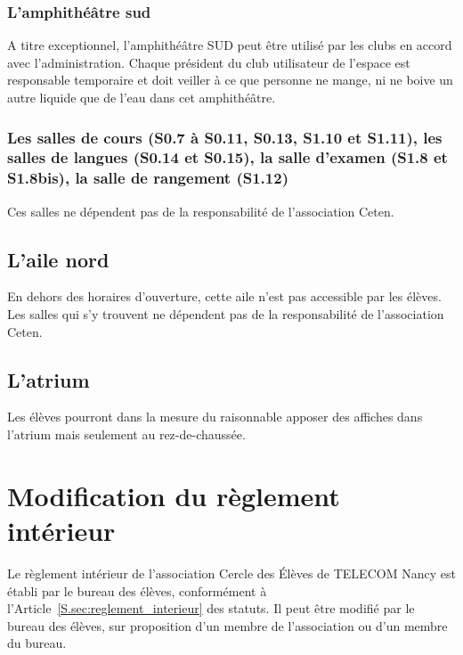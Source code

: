\documentclass{article} %
\begin{document}
			\subsubsection{L'amphithéâtre sud}
\label{ssub:l_amphitheatre_sud}

				A titre exceptionnel, l’amphithéâtre SUD peut être utilisé par
				les clubs en accord avec l’administration. Chaque président du
				club utilisateur de l’espace est responsable temporaire et doit
				veiller à ce que personne ne mange, ni ne boive un autre
				liquide que de l’eau dans cet amphithéâtre.

			\subsubsection{Les salles de cours (S0.7 à S0.11, S0.13, S1.10 et
			S1.11), les salles de langues (S0.14 et S0.15), la salle d'examen
			(S1.8 et S1.8bis), la salle de rangement (S1.12)}
\label{ssub:les_salles_de_cours_s0_7_a_s0_11_s0_13_s1_10_et_s1_11_les_salles_de_langues_s0_14_et_s0_15_la_salle_d_examen_s1_8_et_s1_8bis_la_salle_de_rangement_s1_12_}

				Ces salles ne dépendent pas de la responsabilité de
				l'association Ceten.

		\subsection{L'aile nord}
\label{sub:l_aile_nord}

			En dehors des horaires d’ouverture, cette aile n’est pas accessible
			par les élèves. Les salles qui s’y trouvent ne dépendent pas de la
			responsabilité de l'association Ceten.

		\subsection{L'atrium}
\label{sub:l_atrium}

			Les élèves pourront dans la mesure du raisonnable apposer des
			affiches dans l’atrium mais seulement au rez-de-chaussée.

	\section{Modification du règlement intérieur}
\label{sec:modification_du_reglement_interieur}

		Le règlement intérieur de l’association Cercle des Élèves de TELECOM
		Nancy est établi par le bureau des élèves, conformément à
		l'Article~\ref{S.sec:reglement_interieur} des statuts. Il peut être
		modifié par le bureau des élèves, sur proposition d’un membre de
		l’association ou d’un membre du bureau.
\end{document}
